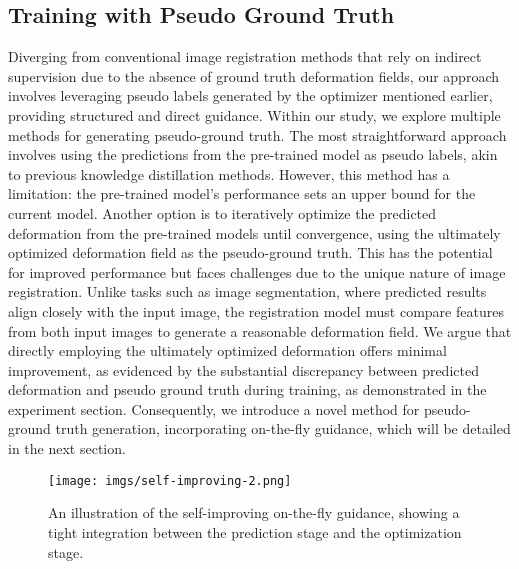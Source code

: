\documentclass[10pt,twocolumn,letterpaper]{article}
\begin{document}
\subsection{Training with Pseudo Ground Truth}\label{method:Pse}


Diverging from conventional image registration methods that rely on indirect supervision due to the absence of ground truth deformation fields, our approach involves leveraging pseudo labels generated by the optimizer mentioned earlier, providing structured and direct guidance. Within our study, we explore multiple methods for generating pseudo-ground truth. The most straightforward approach involves using the predictions from the pre-trained model as pseudo labels, akin to previous knowledge distillation methods. However, this method has a limitation: the pre-trained model's performance sets an upper bound for the current model. Another option is to iteratively optimize the predicted deformation from the pre-trained models until convergence, using the ultimately optimized deformation field as the pseudo-ground truth. This has the potential for improved performance but faces challenges due to the unique nature of image registration. Unlike tasks such as image segmentation, where predicted results align closely with the input image, the registration model must compare features from both input images to generate a reasonable deformation field. We argue that directly employing the ultimately optimized deformation offers minimal improvement, as evidenced by the substantial discrepancy between predicted deformation and pseudo ground truth during training, as demonstrated in the experiment section. Consequently, we introduce a novel method for pseudo-ground truth generation, incorporating on-the-fly guidance, which will be detailed in the next section.

\begin{figure}[t]
    \begin{center}
\texttt{[image: imgs/self-improving-2.png]}
    \end{center}
   \caption{An illustration of the self-improving on-the-fly guidance, showing a tight integration between the prediction stage and the optimization stage.}
   \label{fig:self-improving}
\end{figure}
\end{document}
